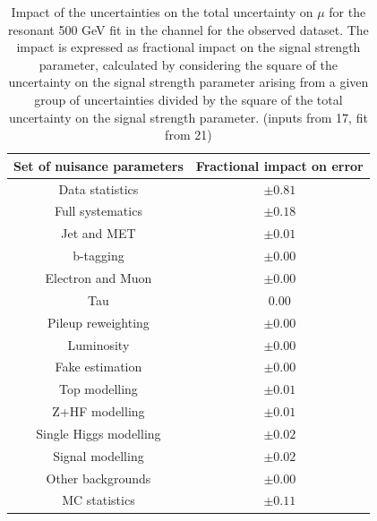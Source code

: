 \begin{table}
\centering
\begin{tabular}{|c|c|}
\hline
Set of nuisance parameters & Fractional impact on error\\
\hline
Data statistics & $\pm 0.81$\\
Full systematics & $\pm 0.18$\\
Jet and MET & $\pm 0.01$ \\
b-tagging & $\pm 0.00$\\
Electron and Muon & $\pm 0.00$\\
Tau & $0.00$\\
Pileup reweighting & $\pm 0.00$\\
Luminosity & $\pm 0.00$\\
Fake estimation & $\pm 0.00$\\
Top modelling & $\pm 0.01$\\ 
Z+HF modelling & $\pm 0.01$\\
Single Higgs modelling & $\pm 0.02$\\
Signal modelling & $\pm 0.02$\\
Other backgrounds & $\pm 0.00$\\
MC statistics & $\pm 0.11$\\
\hline
\end{tabular}
\caption{Impact of the uncertainties on the total uncertainty on $\mu$ for the resonant 500 GeV fit in the \hadhad channel for the observed dataset. The impact is expressed as fractional impact on the signal strength parameter,  calculated by considering the square of the uncertainty on the signal strength parameter arising from a given group of uncertainties divided by the square of the total uncertainty on the signal strength parameter.  (inputs from 17, fit from 21)}
\label{sec:fit:tab:HadHadBreakdown2HDM500Observed}
\end{table}

